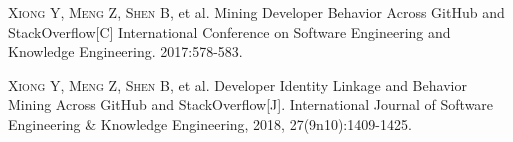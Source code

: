 
\begin{publications}{99}
    \item\textsc{Xiong Y, Meng Z, Shen B}, et al. {Mining Developer Behavior Across GitHub and StackOverflow}[C] International Conference on Software Engineering and Knowledge Engineering. 2017:578-583.
    \item\textsc{Xiong Y, Meng Z, Shen B}, et al. {Developer Identity Linkage and Behavior Mining Across GitHub and StackOverflow}[J]. International Journal of Software Engineering \& Knowledge Engineering, 2018, 27(9n10):1409-1425.
\end{publications}
